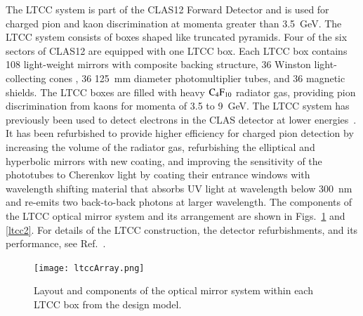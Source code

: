 \documentclass[final,3p,twocolumn]{elsarticle}
\begin{document}
The LTCC system is part of the CLAS12  Forward Detector and is used for charged pion and kaon discrimination at
momenta greater than 3.5~GeV. The LTCC system consists of boxes shaped like truncated pyramids. Four of the six
sectors of CLAS12 are equipped with one LTCC box. Each LTCC box contains 108 light-weight mirrors with composite
backing structure, 36 Winston light-collecting cones , 36 125~mm diameter photomultiplier tubes, and 36 magnetic
shields. The LTCC boxes are filled with heavy $\rm C_4F_{10}$ radiator gas, providing pion discrimination from kaons
for momenta of 3.5 to 9~GeV.  The LTCC system has previously been used to detect electrons in the CLAS detector at
lower energies~\cite{Adams:2001kk}. It has been refurbished to provide higher efficiency for charged pion detection
by increasing the volume of the radiator gas, refurbishing the elliptical and hyperbolic mirrors with new coating, and
improving the sensitivity of the phototubes to Cherenkov light by coating their entrance windows with wavelength
shifting material that absorbs UV light at wavelength below 300~nm and re-emits two back-to-back photons at larger
wavelength. The components of the LTCC optical mirror system and its arrangement are shown in Figs.~\ref{ltcc1}
and \ref{ltcc2}.  For details of the LTCC construction, the detector refurbishments, and its performance, see
Ref.~\cite{LTCC}.   

\begin{figure}[htbp!]
\centerline{\texttt{[image: ltccArray.png]}}
\caption{Layout and components of the optical mirror system within each LTCC box from the design model.}
\label{ltcc1}
\end{figure}
\end{document}
